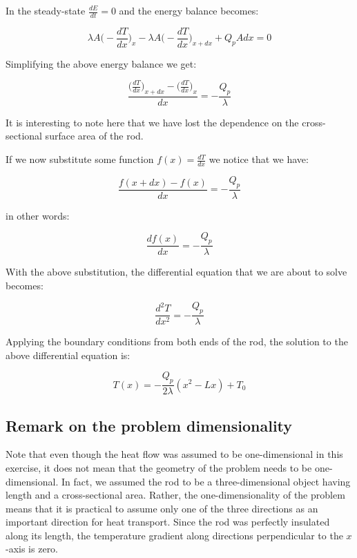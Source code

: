 \documentclass[10pt]{article}
\begin{document}
In the steady-state $\frac{dE}{dt} = 0$ and the energy balance becomes:

\begin{equation}
\lambda A \Big(- \frac{dT}{dx} \Big)_x - \lambda A \Big(- \frac{dT}{dx} \Big)_{x + dx} + Q_p A dx = 0
\end{equation}

Simplifying the above energy balance we get:

\begin{equation*}
\frac{\Big(\frac{dT}{dx} \Big)_{x + dx} - \Big(\frac{dT}{dx} \Big)_x  }{dx} = - \frac{Q_p}{\lambda}
\end{equation*}

It is interesting to note here that we have lost the dependence on the cross-sectional surface area of the rod.

If we now substitute some function $f(x) = \frac{dT}{dx}$ we notice that we have:

\begin{equation*}
\frac{f(x + dx) - f(x)}{dx} = - \frac{Q_p}{\lambda}
\end{equation*}

in other words:

\begin{equation}
\frac{df(x)}{dx} = - \frac{Q_p}{\lambda}
\end{equation}

With the above substitution, the differential equation that we are about to solve becomes:

\begin{equation}
\frac{d^2T}{dx^2} = - \frac{Q_p}{\lambda}
\end{equation}

Applying the boundary conditions from both ends of the rod, the solution to the above differential equation is:

\begin{equation}
T(x) = - \frac{Q_p}{2 \lambda} (x^2 - Lx) + T_0
\label{eq:solution}
\end{equation}

\subsection*{Remark on the problem dimensionality}

Note that even though the heat flow was assumed to be one-dimensional in this exercise, it does not mean that the geometry of the problem needs to be one-dimensional. In fact, we assumed the rod to be a three-dimensional object having length and a cross-sectional area. Rather, the one-dimensionality of the problem means that it is practical to assume only one of the three directions as an important direction for heat transport. Since the rod was perfectly insulated along its length, the temperature gradient along directions perpendicular to the $x$-axis is zero.
\end{document}
